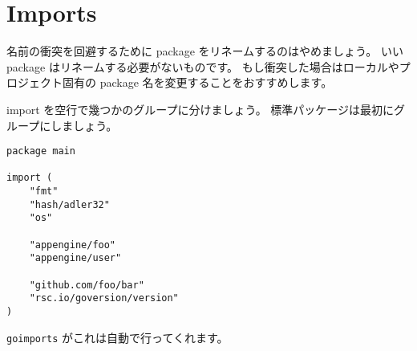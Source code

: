 \section{Imports}

名前の衝突を回避するために package をリネームするのはやめましょう。 いい package はリネームする必要がないものです。 もし衝突した場合はローカルやプロジェクト固有の package 名を変更することをおすすめします。

import を空行で幾つかのグループに分けましょう。 標準パッケージは最初にグループにしましょう。

\begin{lstlisting}[]
package main

import (
    "fmt"
    "hash/adler32"
    "os"

    "appengine/foo"
    "appengine/user"

    "github.com/foo/bar"
    "rsc.io/goversion/version"
)
\end{lstlisting}


\texttt{goimports} がこれは自動で行ってくれます。

